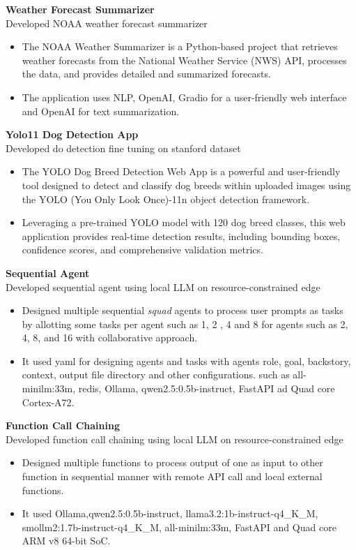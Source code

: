 \documentclass[10pt,a4paper]{article}
\begin{document}
	\textbf{Weather Forecast Summarizer} \hfill \textit{}\\
  Developed NOAA weather forecast summarizer
	\begin{itemize}[leftmargin=0.2in]
		\item The NOAA Weather Summarizer is a Python-based project that retrieves weather forecasts from the National Weather Service (NWS) API, processes the data, and provides detailed and summarized forecasts. 
		\item The application uses NLP, OpenAI, Gradio for a user-friendly web interface and OpenAI for text summarization.
		
	\end{itemize}

	\textbf{Yolo11 Dog Detection App} \hfill \textit{}\\
Developed do detection fine tuning on stanford dataset
\begin{itemize}[leftmargin=0.2in]
	\item The YOLO Dog Breed Detection Web App is a powerful and user-friendly tool designed to detect and classify dog breeds within uploaded images using the YOLO (You Only Look Once)-11n object detection framework. 
	
	\item Leveraging a pre-trained YOLO model with 120 dog breed classes, this web application provides real-time detection results, including bounding boxes, confidence scores, and comprehensive validation metrics.
	
\end{itemize}

	\textbf{Sequential Agent} \hfill \textit{}\\
	Developed sequential agent using local LLM on resource-constrained edge
	\begin{itemize}[leftmargin=0.2in]
		\item Designed multiple sequential \textit{squad} agents to process user prompts as tasks by allotting some tasks per agent such as 1, 2 , 4 and 8 for agents such as 2, 4, 8, and 16 with collaborative approach.
		\item It used yaml for designing agents and tasks with agents role, goal, backstory, context, output file directory and other configurations. such as all-minilm:33m, redis, Ollama, qwen2.5:0.5b-instruct, FastAPI ad Quad core Cortex-A72.
		
	\end{itemize}
	
	\textbf{Function Call Chaining} \hfill \textit{}\\
	Developed function call chaining using local LLM on resource-constrained edge
	\begin{itemize}[leftmargin=0.2in]
		\item Designed multiple functions to process output of one as input to other function in sequential manner with remote API call and local external functions.
		\item It used Ollama,qwen2.5:0.5b-instruct, llama3.2:1b-instruct-q4\_K\_M, smollm2:1.7b-instruct-q4\_K\_M, all-minilm:33m, FastAPI and Quad core ARM v8 64-bit SoC.
		
	\end{itemize}
	
\end{document}
